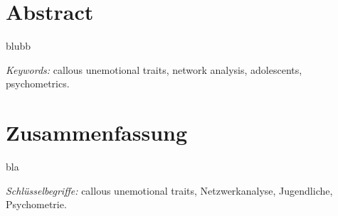 \section*{Abstract}
\noindent blubb




\textit{Keywords:} callous unemotional traits, network analysis, adolescents, psychometrics.


\section*{Zusammenfassung}
\noindent bla

\textit{Schl\"usselbegriffe:} callous unemotional traits, Netzwerkanalyse, Jugendliche, Psychometrie.



